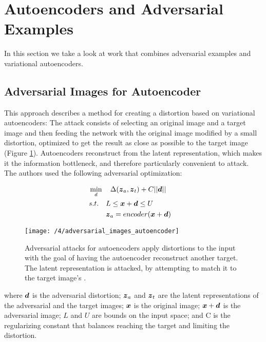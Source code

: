\section{Autoencoders and Adversarial Examples}\label{sec:combining}
In this section we take a look at work that combines adversarial examples and
variational autoencoders.

\subsection{Adversarial Images for Autoencoder}
This approach \cite{tabacof2016adversarial} describes a method for creating a
distortion based on variational autoencoders: The attack consists of selecting
an original image and a target image and then feeding the network with the
original image modified by a small distortion, optimized to get the result as close
as possible to the target image (Figure
\ref{fig:adversarial_images_autoencoder}). Autoencoders reconstruct from the
latent representation, which makes it the information bottleneck, and therefore
particularly convenient to attack. The authors used the following adversarial
optimization:
    
\begin{align}
    & \min_{d} \quad \Delta(\boldsymbol{z}_{a}, \boldsymbol{z}_{t}) + C||\boldsymbol{d}|| && \\
    & s.t. \quad  
        \begin{aligned}[t]
            & L \leq \boldsymbol{x} + \boldsymbol{d} \leq U \\
            & \boldsymbol{z}_a = encoder(\boldsymbol{x} + \boldsymbol{d})
        \end{aligned}
\end{align}

\begin{figure}
	\centering
	\texttt{[image: /4/adversarial\_images\_autoencoder]}
    \caption{Adversarial attacks for autoencoders apply distortions to the input
    with the goal of having the autoencoder reconstruct another target. The
    latent representation is attacked, by attempting to match it to the target
    image's
    \cite{tabacof2016adversarial}.} 
	\label{fig:adversarial_images_autoencoder}
\end{figure}

where $\boldsymbol{d}$ is the adversarial distortion; $\boldsymbol{z}_{a}$ and
$\boldsymbol{z}_{t}$ are the latent representations of the adversarial and the target
images; $\boldsymbol{x}$ is the original image; $\boldsymbol{x} + \boldsymbol{d}$ is the
adversarial image; $L$ and $U$ are bounds on the input space; and C is the
regularizing constant that balances reaching the target and limiting the
distortion.

